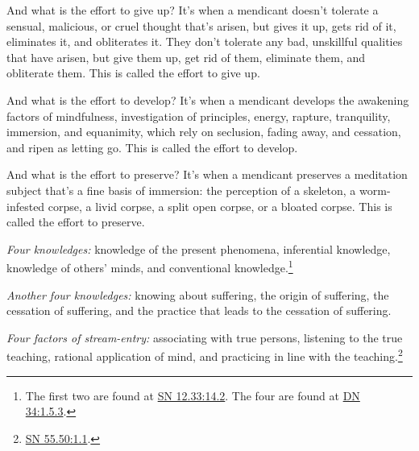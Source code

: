 \documentclass[12pt,openany]{book}%
\begin{document}
And what is the effort to give up? It’s when a mendicant doesn’t tolerate a sensual, malicious, or cruel thought that’s arisen, but gives it up, gets rid of it, eliminates it, and obliterates it. They don’t tolerate any bad, unskillful qualities that have arisen, but give them up, get rid of them, eliminate them, and obliterate them. This is called the effort to give up. 

And what is the effort to develop? It’s when a mendicant develops the awakening factors of mindfulness, investigation of principles, energy, rapture, tranquility, immersion, and equanimity, which rely on seclusion, fading away, and cessation, and ripen as letting go. This is called the effort to develop. 

And what is the effort to preserve? It’s when a mendicant preserves a meditation subject that’s a fine basis of immersion: the perception of a skeleton, a worm-infested corpse, a livid corpse, a split open corpse, or a bloated corpse. This is called the effort to preserve. 

\emph{Four knowledges:} knowledge of the present phenomena, inferential knowledge, knowledge of others’ minds, and conventional knowledge.\footnote{The first two are found at \href{https://suttacentral.net/sn12.33/en/sujato\#14.2}{SN 12.33:14.2}. The four are found at \href{https://suttacentral.net/dn34/en/sujato\#1.5.3}{DN 34:1.5.3}. } 

\emph{Another four knowledges:} knowing about suffering, the origin of suffering, the cessation of suffering, and the practice that leads to the cessation of suffering. 

\emph{Four factors of stream-entry:} associating with true persons, listening to the true teaching, rational application of mind, and practicing in line with the teaching.\footnote{\href{https://suttacentral.net/sn55.50/en/sujato\#1.1}{SN 55.50:1.1}. } 
\end{document}
